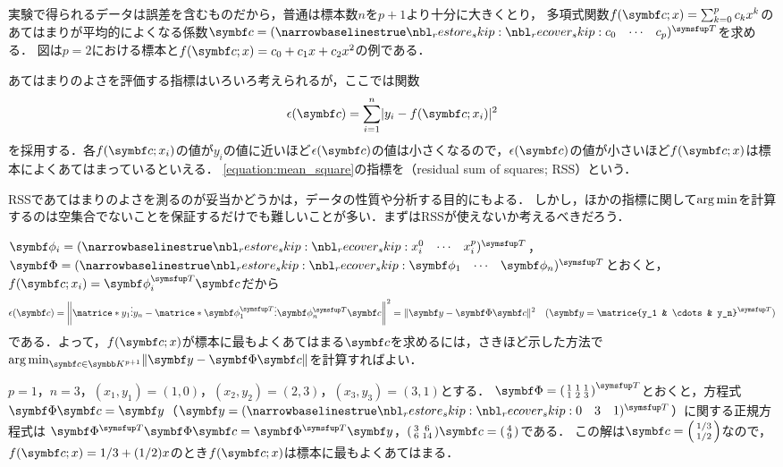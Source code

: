\documentclass[../../main]{subfiles}
\begin{document}
実験で得られるデータは誤差を含むものだから，普通は標本数\(n\)を\(p+1\)より十分に大きくとり，
多項式関数\(f(\vect{c};x)=\sum_{k=0}^pc_kx^k\)のあてはまりが平均的によくなる係数\(\vect{c}=\trps{\rowvect{c_0 & \cdots & c_p}}\)を求める．
図は\(p=2\)における標本と\(f(\vect{c};x)=c_0+c_1x+c_2x^2\)の例である．

あてはまりのよさを評価する指標はいろいろ考えられるが，ここでは関数
\begin{equation}
  \label{equation:mean_square}
  \epsilon(\vect{c}) = \sum_{i=1}^n\abs{y_i-f(\vect{c};x_i)}^2
\end{equation}
を採用する．各\(f(\vect{c};x_i)\)の値が\(y_i\)の値に近いほど\(\epsilon(\vect{c})\)の値は小さくなるので，\(\epsilon(\vect{c})\)の値が小さいほど\(f(\vect{c};x)\)は標本によくあてはまっているといえる．
\cref{equation:mean_square}の指標を（residual sum of squares; RSS）という．

\begin{note}
  RSSであてはまりのよさを測るのが妥当かどうかは，データの性質や分析する目的にもよる．
  しかし，ほかの指標に関して\(\operatorname*{arg\,min}\)を計算するのは\texttwoemdash 空集合でないことを保証するだけでも\texttwoemdash 難しいことが多い．まずはRSSが使えないか考えるべきだろう．
\end{note}

\(\vect{\phi}_i=\trps{\rowvect{x_i^0 & \cdots & x_i^p}}\)，\(\mat{\Phi}=\trps{\rowvect{\vect{\phi}_1 & \cdots & \vect{\phi}_n}}\)とおくと，\(f(\vect{c};x_i)=\trps{\vect{\phi}_i}\vect{c}\)だから
\[
  \epsilon(\vect{c}) = \vnorm*{\matrice*{y_1 \\ \vdots \\ y_n}-\matrice*{\trps{\vect{\phi}_1} \\ \vdots \\ \trps{\vect{\phi}_n}}\vect{c}}^2
  = \vnorm{\vect{y}-\mat{\Phi}\vect{c}}^2\quad(\vect{y}=\trps{\matrice{y_1 & \cdots & y_n}})
\]
である．よって，\(f(\vect{c};x)\)が標本に最もよくあてはまる\(\vect{c}\)を求めるには，さきほど示した方法で\(\argmin_{\vect{c}\in\numset{K}^{p+1}}\vnorm{\vect{y}-\mat{\Phi}\vect{c}}\)を計算すればよい．

\begin{example}
  \label{example:linear_regression}
  \(p=1\)，\(n=3\)，\((x_1,y_1)=(1,0)\)，\((x_2,y_2)=(2,3)\)，\((x_3,y_3)=(3,1)\)とする．
  \(\mat{\Phi}=\trps{\smallmatrice{1 & 1 & 1 \\ 1 & 2 & 3}}\)とおくと，方程式\(\mat{\Phi}\vect{c}=\vect{y}\)（\(\vect{y}=\trps{\rowvect{0 & 3 & 1}}\)）に関する正規方程式は
  \(\trps{\mat{\Phi}}\mat{\Phi}\vect{c}=\trps{\mat{\Phi}}\vect{y}\)，\(\smallmatrice{3 & 6 \\ 6 & 14}\vect{c}=\smallmatrice{4 \\ 9}\)である．
  この解は\(\vect{c}=\smallmatrice{1/3 \\ 1/2}\)なので，\(f(\vect{c};x)=1/3+(1/2)x\)のとき\(f(\vect{c};x)\)は標本に最もよくあてはまる．
\end{example}
\end{document}
